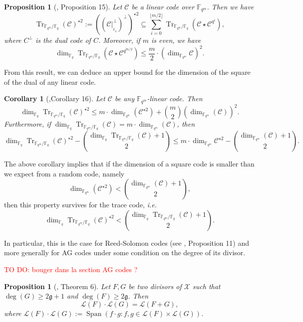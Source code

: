 \documentclass[a4paper]{article}
\newtheorem{proposition}[thm]{Proposition}
\newtheorem{coro}[thm]{Corollary}
\theoremstyle{definition}
\theoremstyle{remark}
\newcommand{\calL}{\mathcal{L}}
\newcommand{\calC}{\mathcal{C}}
\newcommand{\calX}{\mathcal{X}}
\newcommand{\fqm}{\mathbb{F}_{q^m}}
\newcommand{\fq}{\mathbb{F}_{q}}
\newcommand{\Tr}[1]{\operatorname{Tr}_{\mathbb{F}_{q^m}/\fq}\left(#1\right)}
\newcommand{\Span}[1]{\operatorname{Span}\left(#1\right)}
\newcommand\TODO[1]{\textcolor{red}{TO DO: #1}}
\begin{document}
\begin{proposition}[\cite{MT21}, Proposition 15] \label{prop:Tr_BoundSchurSquare}
Let $\calC$ be a linear code over $\fqm$. Then we have 
\begin{equation} \label{eq:key_equation} \Tr{\calC}^{\star2} := ((\calC|^{\perp}_{_{{\mathbb{F}_q}}})^{\perp})^{\star2} \subseteq \sum\limits_{i=0}^{\lfloor{m/2} \rfloor} \Tr{\calC\star \calC^{q^i}},
\end{equation}
where $C^{\perp}$ is the dual code of $C$. %
Moreover, if $m$ is even, we have 
\[\dim_{\mathbb{F}_q}\Tr{ \calC \star \calC^{q^{m/2}}} \leq \frac{m}{2}\cdot \left(\dim_{\fqm}\calC\right)^2.\]
\end{proposition}

From this result, we can deduce an upper bound for the dimension of the square of the dual of any linear code.

\begin{coro} [\cite{MT21},Corollary 16]\label{coro:first_bound_square_of_trace}
Let $\calC$ be any $\fqm$-linear code. Then 
\begin{equation} \label{eq:mumford_bound}
    \dim_{\fq}\Tr{\calC}^{\star2} \leq m \cdot \dim_{\fqm}(\calC^{\star 2}) + \binom{m}{2} (\dim_{\fqm}(\calC))^2.
\end{equation}
Furthermore, if $\dim_{\fq} \Tr{\calC} = m \cdot \dim_{\fqm}(\calC)$, then 
\[\dim_{\fq} \Tr{\calC}^{\star2} - \binom{\dim_{\fq} \Tr{\calC}+1}{2} \leq m \cdot \dim_{\fqm} \calC^{\star 2} - \binom{\dim_{\fqm} (\calC)+1}{2}.\]
\end{coro}

The above corollary implies that if the dimension of a square code is smaller than we expect from a random code, namely
\[ \dim_{\fqm} (\calC^{\star 2}) < \binom{\dim_{\fqm} (\calC)+1}{2},\]
then this property survives for the trace code, \emph{i.e.}
\[\dim_{\fq} \Tr{\calC}^{\star 2} < \binom{\dim_{\fq} \Tr{\calC}+1}{2}.\]

In particular, this is the case for Reed-Solomon codes (see \cite{MT21}, Proposition 11) and more generally for AG codes under some condition on the degree of its divisor.

\TODO{bouger dans la section AG codes ?}

\begin{proposition}[\cite{Mum70}, Theorem 6] \label{prop:mumford_result}
Let $F,G$ be two divisors of $\calX$ such that $\deg(G) \geq 2\mathfrak{g}+1$ and $\deg(F) \geq 2\mathfrak{g}$. Then
\[ \calL(F) \cdot \calL(G) = \calL(F+G),\]
where $\calL(F) \cdot \calL(G) := \Span{ f \cdot g : f,g \in \calL(F) \times \calL(G)}$.
\end{proposition}
\end{document}
